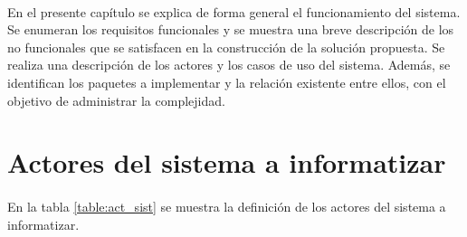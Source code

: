 
\chap{\CapTres}
\paragraph{}En el presente capítulo se explica de forma general el funcionamiento del sistema. Se enumeran los requisitos funcionales y se muestra una breve descripción de los no funcionales que se satisfacen en la construcción de la solución propuesta. Se realiza una descripción de los actores y los casos de uso del sistema. Además, se identifican los paquetes a implementar y la relación existente entre ellos, con el objetivo de administrar la complejidad.

\section{Actores del sistema a informatizar}
\paragraph{}En la tabla \ref{table:act_sist} se muestra la definición de los actores del sistema a informatizar.

